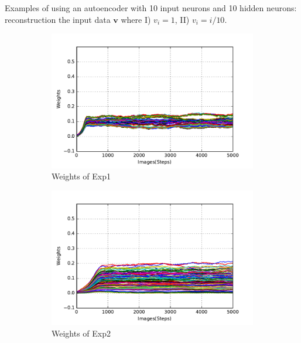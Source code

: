 Examples of using an autoencoder with 10 input neurons and 10 hidden neurons: reconstruction the input data $\mathbf{v}$ where I) $v_i = 1$, II) $v_i = i/10$.
\begin{figure}
	\centering
	\begin{subfigure}[t]{0.4\textwidth}
		\includegraphics[width=\textwidth]{pics_sdlm/30_exp_RBM/exp1_weights_non.pdf}
		\caption{Weights of Exp1}
	\end{subfigure}
	\begin{subfigure}[t]{0.4\textwidth}
		\includegraphics[width=\textwidth]{pics_sdlm/30_exp_RBM/exp2_weights_non.pdf}
		\caption{Weights of Exp2}
	\end{subfigure}
	\begin{subfigure}[t]{0.4\textwidth}

\end{subfigure}
\end{figure}
